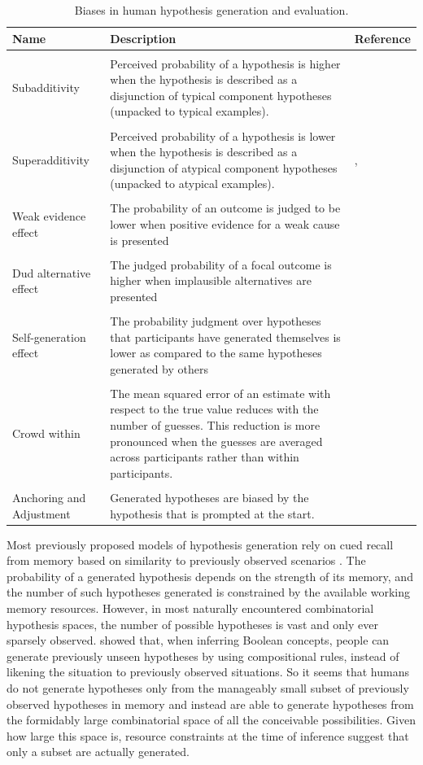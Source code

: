 \begin{table}[htbp]
\centering
\caption{Biases in human hypothesis generation and evaluation.}
\label{tab:biases}
\begin{tabular}{p{}>{\raggedright}p{}>{\raggedright}p{}}
\toprule
\textbf{Name}&\textbf{Description}& \textbf{Reference}\tabularnewline
\midrule \tabularnewline
Subadditivity& Perceived probability of a hypothesis is higher when the hypothesis is described as a disjunction of typical component hypotheses (unpacked to typical examples). & \citet{fox1998belief} \tabularnewline\tabularnewline
Superadditivity& Perceived probability of a hypothesis is lower when the hypothesis is described as a disjunction of atypical component hypotheses (unpacked to atypical examples). & \citet{super}, \citet{hadjichristidis1999opening} \tabularnewline\tabularnewline
Weak evidence effect& The probability of an outcome is judged to be lower when positive evidence for a weak cause is presented & \citet{weak}\tabularnewline\tabularnewline
Dud alternative effect & The judged probability of a focal outcome is higher when implausible alternatives are presented & \citet{dud}\tabularnewline\tabularnewline
Self-generation effect & The probability judgment over hypotheses that participants have generated themselves is lower as compared to the same hypotheses generated by others& \citet{koriat1980,conf} \tabularnewline\tabularnewline
Crowd within & The mean squared error of an estimate with respect to the true value reduces with the number of guesses. This reduction is more pronounced when the guesses are averaged across participants rather than within participants. & \citet{vul08}
\tabularnewline\tabularnewline
Anchoring and Adjustment & Generated hypotheses are biased by the hypothesis that is prompted at the start. & \citet{tversky} \tabularnewline
\bottomrule
\end{tabular}
\end{table}

Most previously proposed models of hypothesis generation rely on cued recall from memory based on similarity to previously observed scenarios \citep[c.f.][]{Thomas2008, gennaioli2010comes}. The probability of a generated hypothesis depends on the strength of its memory, and the number of such hypotheses generated is constrained by the available working memory resources. However, in most naturally encountered combinatorial hypothesis spaces, the number of possible hypotheses is vast and only ever sparsely observed. \cite{Goodman2008} showed that, when inferring Boolean concepts, people can generate previously unseen hypotheses by using compositional rules, instead of likening the situation to previously observed situations. So it seems that humans do not generate hypotheses only from the manageably small subset of previously observed hypotheses in memory and instead are able to generate hypotheses from the formidably large combinatorial space of all the conceivable possibilities. Given how large this space is, resource constraints at the time of inference suggest that only a subset are actually generated.


